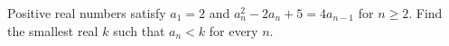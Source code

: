 Positive real numbers satisfy $ a_1=2 $ and $ a_n^2-2a_n+5=4a_{n-1}$ for $ n\ge2 $. Find the smallest real $ k $ such that $ a_n<k $ for every $ n $.
